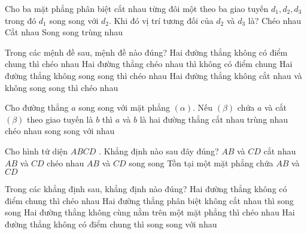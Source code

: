 \begin{ex}%
Cho ba mặt phẳng phân biệt cắt nhau từng đôi một theo ba giao tuyến $d_1,d_2,d_3$ trong đó $d_1$ song song với $d_2$. Khi đó vị trí tương đối của $d_2$ và $d_3$ là?
\choice
{Chéo nhau}
{Cắt nhau}
{\True Song song}
{trùng nhau}
\end{ex}

\begin{ex}%
Trong các mệnh đề sau, mệnh đề nào đúng?
\choice
{Hai đường thẳng không có điểm chung thì chéo nhau}
{\True Hai đường thẳng chéo nhau thì không có điểm chung}
{Hai đường thẳng không song song thì chéo nhau}
{Hai đường thẳng không cắt nhau và không song song thì chéo nhau}
\end{ex}

\begin{ex}%
Cho đường thẳng $ a$ song song với mặt phẳng $\left(\alpha\right)$. Nếu $\left(\beta\right)$ chứa $ a$ và cắt $\left(\beta\right)$ theo giao tuyến là $ b$ thì $ a$ và $ b$ là hai đường thẳng
\choice
{cắt nhau}
{trùng nhau}
{chéo nhau}
{\True song song với nhau}
\loigiai{
}
\end{ex}

\begin{ex}%
Cho hình tứ diện $ABCD$ . Khẳng định nào sau đây đúng?
\choice
{$AB$ và $ CD$ cắt nhau}
{\True $AB$ và $ CD$ chéo nhau}
{$AB$ và $ CD$ song song}
{Tồn tại một mặt phẳng chứa $AB$ và $ CD$}
\end{ex}

\begin{ex}%
Trong các khẳng định sau, khẳng định nào đúng?
\choice
{Hai đường thẳng không có điểm chung thì chéo nhau}
{Hai đường thẳng phân biệt không cắt nhau thì song song}
{\True Hai đường thẳng không cùng nằm trên một mặt phẳng thì chéo nhau}
{Hai đường thẳng không có điểm chung thì song song với nhau}
\loigiai{
}
\end{ex}

